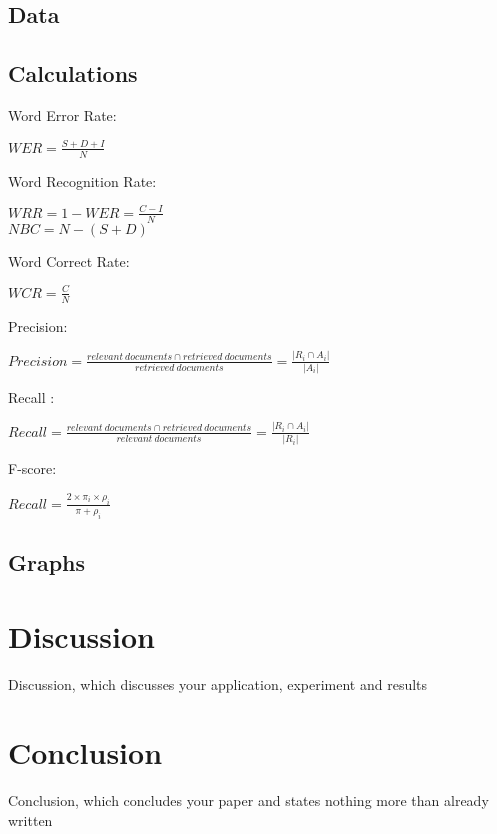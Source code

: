 \documentclass{article}
\begin{document}
\subsection{Data}
\subsection{Calculations}
    
    Word Error Rate: 
    \begin{center}
    $ WER = \frac{S + D + I}{N}$ \\
    \end{center} 
    
    Word Recognition Rate: 
    \begin{center}
    $ WRR = 1 - WER = \frac{C - I}{N}$ \\
    $ NBC =N - (S + D)$ \\
    \end{center} 
    
    Word Correct Rate: 
    \begin{center}
    $ WCR = \frac{C}{N}$ \\
    \end{center} 
    
    Precision: 
    \begin{center}
    $ Precision = \frac{relevant\ documents \cap retrieved\ documents}{retrieved\ documents} = \frac{|R_i \cap A_i|}{|A_i|} $ \\
    \end{center} 
    
    Recall : 
    \begin{center}
    $ Recall = \frac{relevant\ documents \cap retrieved\ documents}{relevant\ documents} = \frac{|R_i \cap A_i|}{|R_i|} $ \\
    \end{center} 
    
    F-score:
    \begin{center}
    $ Recall = \frac{2 \times \pi_i \times \rho_i}{\pi + \rho_i} $\\
    \end{center} 

\subsection{Graphs}

\section{Discussion}
Discussion, which discusses your application, experiment and results

\section{Conclusion}
Conclusion, which concludes your paper and states nothing more than already
written

 
 
\end{document}
